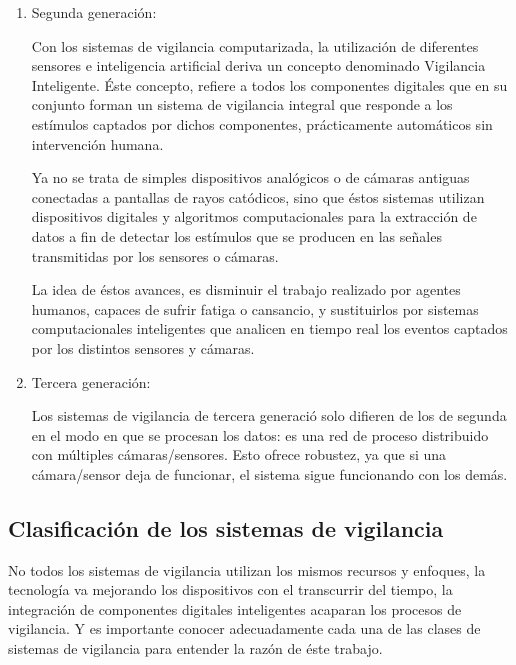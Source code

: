 \documentclass[a4paper,12pt,oneside,spanish]{book}
\begin{document}
\begin{enumerate}
	\item Segunda generación: \par
	Con los sistemas de vigilancia computarizada, la utilización de diferentes sensores e inteligencia artificial deriva un concepto denominado Vigilancia Inteligente. Éste concepto, refiere a todos los componentes digitales que en su conjunto forman un sistema de vigilancia integral que responde a los estímulos captados por dichos componentes, prácticamente automáticos sin intervención humana. \par
	Ya no se trata de simples dispositivos analógicos o de cámaras antiguas conectadas a pantallas de rayos catódicos, sino que éstos sistemas utilizan dispositivos digitales y algoritmos computacionales para la extracción de datos a fin de detectar los estímulos que se producen en las señales transmitidas por los sensores o cámaras.
	\par
	La idea de éstos avances, es disminuir el trabajo realizado por agentes humanos, capaces de sufrir fatiga o cansancio, y sustituirlos por sistemas computacionales inteligentes que analicen en tiempo real los eventos captados por los distintos sensores y cámaras.\\
	
	\item Tercera generación: \par
	Los sistemas de vigilancia de tercera generació solo difieren de los de segunda en el modo en que se procesan los datos: es una red de proceso distribuido con múltiples cámaras/sensores. Esto ofrece robustez, ya que si una cámara/sensor deja de funcionar, el sistema sigue funcionando con los demás.
	\\
\end{enumerate}	\baselineskip 14pt



\subsection{Clasificación de los sistemas de vigilancia}

No todos los sistemas de vigilancia utilizan los mismos recursos y enfoques, la tecnología va mejorando los dispositivos con el transcurrir del tiempo, la integración de componentes digitales inteligentes acaparan los procesos de vigilancia. Y es importante conocer adecuadamente cada una de las clases de sistemas de vigilancia para entender la razón de éste trabajo.  \par
\end{document}
